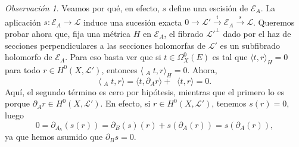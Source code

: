 \documentclass[12pt, a4paper]{amsart}
\newcommand\EE{\mathscr{E}}
\newcommand\LL{\mathscr{L}}
\DeclareMathOperator\delbar{\bar{\partial}}
\theoremstyle{remark} \newtheorem{rmk}[thm]{Observación}
\theoremstyle{remark} \newtheorem{rmks}[thm]{Observaciones}
\theoremstyle{definition} \newtheorem{defn}[thm]{Definición}
\theoremstyle{definition} \newtheorem{ejs}[thm]{Ejemplos}
\theoremstyle{definition} \newtheorem{ej}[thm]{Ejemplo}
\begin{document}
\begin{rmk}
	Veamos por qué, en efecto, $s$ define una escisión de $\EE_A$.
	La aplicación $s:\EE_A \rightarrow \LL$ induce una sucesión exacta $0\rightarrow \LL' \overset{i}{\rightarrow} \EE_A \overset{s}{\rightarrow} \LL$. Queremos probar ahora que, fija una métrica $H$ en $\EE_A$, el fibrado $\LL'^\perp$ dado por el haz de secciones perpendiculares a las secciones holomorfas de $\LL'$ es un subfibrado holomorfo de $\EE_A$. Para eso basta ver que si $t \in \Omega_X^0(E)$ es tal que $\langle t,r \rangle_H=0$ para todo $r\in H^0(X,\LL')$, entonces $\langle \delbar_A t, r \rangle_H = 0$. Ahora,
	\begin{equation*}
		\langle \delbar_A t, r\rangle = \langle t, \partial_{A} r \rangle + \delbar \langle t, r\rangle = 0.
	\end{equation*} 
	Aquí, el segundo término es cero por hipótesis, mientras que el primero lo es porque $\partial_A r \in H^0(X,\LL')$. En efecto, si $r\in H^0(X,\LL')$, tenemos $s(r)=0$, luego
	\begin{equation*}
		0= \partial_{A_h}(s(r))=\partial_B(s)(r) + s(\partial_{A}(r)) = s(\partial_{A}(r)),
	\end{equation*} 
	ya que hemos asumido que $\partial_B s =0$.

\end{rmk}
\end{document}
